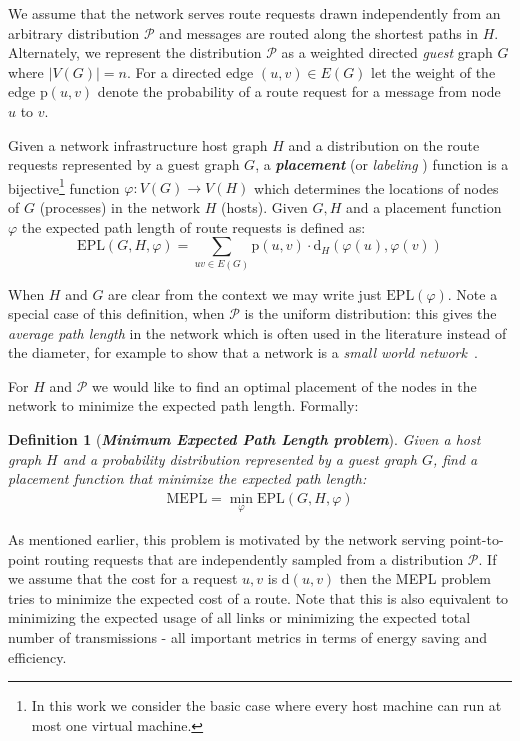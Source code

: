 \documentclass[conference]{IEEEtran}
\newcommand{\card}[1]{\lvert #1\rvert}
\def\d{\mathrm{d}}
\def\p{\mathrm{p}}
\def\Pc{\mathcal{P}}
\def\epl{\mathrm{EPL}}
\def\mepl{\mathrm{MEPL}}
\newtheorem{definition}{Definition}
\begin{document}
We assume that the network serves route requests drawn independently from an arbitrary distribution $\Pc$ and messages are routed along the shortest paths in $H$. 
Alternately, we represent the distribution $\Pc$ as a weighted directed \emph{guest} graph $G$ where $\card{V(G)} = n$.
For a directed edge $(u,v) \in E(G)$ let the weight of the edge $\p(u,v)$ denote the probability of a route request for a message
from node $u$ to $v$.









Given a network infrastructure host graph $H$ and a distribution on the route requests represented by a guest graph $G$,
 a {\bf \emph{placement}} (or \emph{labeling} \cite{chung1988labelings}) function is
a bijective\footnote{In this work we consider the basic case where every host machine can run at most one virtual machine.} function $\varphi: V(G) \rightarrow V(H)$ which determines the locations of nodes of $G$ (processes) in the network $H$ (hosts).
Given  $G, H$ and a placement  function $\varphi$ the expected path length of route requests is defined as:
$$
\epl(G, H, \varphi) = \sum_{uv \in E(G)} \mathrm{p}(u, v) \cdot \mathrm{d}_ {H}(\varphi(u),\varphi(v))
$$

When $H$ and $G$ are clear from the context we may write just $\epl(\varphi)$.
Note a special case of this definition, when $\Pc$ is the uniform distribution: this gives the \emph{average path length} in the network which is often used in the literature instead of the diameter, for example to show that a network is a \emph{small world network}~\cite{watts1998collective}.

For $H$ and $\Pc$ we would like to find an optimal placement of the nodes in the network to minimize the expected path length. Formally:
\begin{definition}[\bf \emph{Minimum Expected Path Length problem}]
Given a host graph $H$ and a probability distribution represented by a guest graph $G$, find a placement function that minimize the expected path length:
\begin{align}
\mepl = \min_\varphi \epl(G, H, \varphi)
\end{align}
\end{definition}




As mentioned earlier, this problem is motivated by the network serving point-to-point routing requests that are independently sampled from a distribution $\Pc$. If we assume that the cost for a request ${u,v}$ is $\d(u,v)$ then the MEPL problem tries to minimize the expected cost of a route. Note that this is also equivalent to minimizing the expected usage of all links or  minimizing the expected total number of transmissions - all important metrics in terms of energy saving and efficiency.
\end{document}
